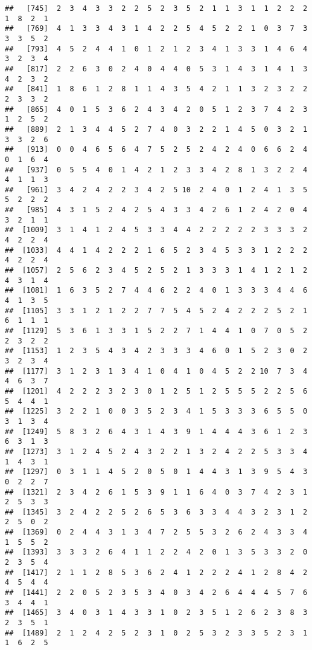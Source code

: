 \documentclass[
]{article}
\begin{document}
\begin{verbatim}
##   [745]  2  3  4  3  3  2  2  5  2  3  5  2  1  1  3  1  1  2  2  2  1  8  2  1
##   [769]  4  1  3  3  4  3  1  4  2  2  5  4  5  2  2  1  0  3  7  3  3  3  5  2
##   [793]  4  5  2  4  4  1  0  1  2  1  2  3  4  1  3  3  1  4  6  4  3  2  3  4
##   [817]  2  2  6  3  0  2  4  0  4  4  0  5  3  1  4  3  1  4  1  3  4  2  3  2
##   [841]  1  8  6  1  2  8  1  1  4  3  5  4  2  1  1  3  2  3  2  2  2  3  3  2
##   [865]  4  0  1  5  3  6  2  4  3  4  2  0  5  1  2  3  7  4  2  3  1  2  5  2
##   [889]  2  1  3  4  4  5  2  7  4  0  3  2  2  1  4  5  0  3  2  1  3  3  2  6
##   [913]  0  0  4  6  5  6  4  7  5  2  5  2  4  2  4  0  6  6  2  4  0  1  6  4
##   [937]  0  5  5  4  0  1  4  2  1  2  3  3  4  2  8  1  3  2  2  4  4  1  1  3
##   [961]  3  4  2  4  2  2  3  4  2  5 10  2  4  0  1  2  4  1  3  5  5  2  2  2
##   [985]  4  3  1  5  2  4  2  5  4  3  3  4  2  6  1  2  4  2  0  4  3  2  1  1
##  [1009]  3  1  4  1  2  4  5  3  3  4  4  2  2  2  2  2  3  3  3  2  4  2  2  4
##  [1033]  4  4  1  4  2  2  2  1  6  5  2  3  4  5  3  3  1  2  2  2  4  2  2  4
##  [1057]  2  5  6  2  3  4  5  2  5  2  1  3  3  3  1  4  1  2  1  2  4  3  1  4
##  [1081]  1  6  3  5  2  7  4  4  6  2  2  4  0  1  3  3  3  4  4  6  4  1  3  5
##  [1105]  3  3  1  2  1  2  2  7  7  5  4  5  2  4  2  2  2  5  2  1  6  1  1  1
##  [1129]  5  3  6  1  3  3  1  5  2  2  7  1  4  4  1  0  7  0  5  2  2  3  2  2
##  [1153]  1  2  3  5  4  3  4  2  3  3  3  4  6  0  1  5  2  3  0  2  3  2  3  4
##  [1177]  3  1  2  3  1  3  4  1  0  4  1  0  4  5  2  2 10  7  3  4  4  6  3  7
##  [1201]  4  2  2  2  3  2  3  0  1  2  5  1  2  5  5  5  2  2  5  6  5  4  4  1
##  [1225]  3  2  2  1  0  0  3  5  2  3  4  1  5  3  3  3  6  5  5  0  3  1  3  4
##  [1249]  5  8  3  2  6  4  3  1  4  3  9  1  4  4  4  3  6  1  2  3  6  3  1  3
##  [1273]  3  1  2  4  5  2  4  3  2  2  1  3  2  4  2  2  5  3  3  4  1  4  3  1
##  [1297]  0  3  1  1  4  5  2  0  5  0  1  4  4  3  1  3  9  5  4  3  0  2  2  7
##  [1321]  2  3  4  2  6  1  5  3  9  1  1  6  4  0  3  7  4  2  3  1  2  5  3  3
##  [1345]  3  2  4  2  2  5  2  6  5  3  6  3  3  4  4  3  2  3  1  2  2  5  0  2
##  [1369]  0  2  4  4  3  1  3  4  7  2  5  5  3  2  6  2  4  3  3  4  1  5  5  2
##  [1393]  3  3  3  2  6  4  1  1  2  2  4  2  0  1  3  5  3  3  2  0  2  3  5  4
##  [1417]  2  1  1  2  8  5  3  6  2  4  1  2  2  2  4  1  2  8  4  2  4  5  4  4
##  [1441]  2  2  0  5  2  3  5  3  4  0  3  4  2  6  4  4  4  5  7  6  3  4  4  1
##  [1465]  3  4  0  3  1  4  3  3  1  0  2  3  5  1  2  6  2  3  8  3  2  3  5  1
##  [1489]  2  1  2  4  2  5  2  3  1  0  2  5  3  2  3  3  5  2  3  1  1  6  2  5

\end{verbatim}
\end{document}
